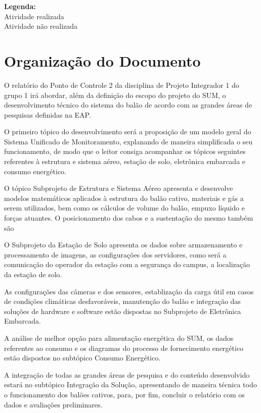 \noindent \textbf{Legenda:} \\
\crule[red]{0.5cm}{0.3cm}	Atividade realizada \\
\crule[blue]{0.5cm}{0.3cm} Atividade não realizada \\

\section{Organização do Documento} %
\label{sec:organiza_o_do_documento}

  O relatório do Ponto de Controle 2 da disciplina de Projeto Integrador 1 do grupo 1 irá abordar, além da definição do escopo do projeto do SUM, o desenvolvimento técnico do sistema do balão de acordo com as grandes áreas de pesquisas definidas na EAP.

  O primeiro tópico do desenvolvimento será a proposição de um modelo geral do Sistema Unificado de Monitoramento, explanando de maneira simplificada o seu funcionamento, de modo que o leitor consiga acompanhar os tópicos seguintes referentes à estrutura e sistema aéreo, estação de solo, eletrônica embarcada e consumo energético.

  O tópico Subprojeto de Estrutura e Sistema Aéreo apresenta e desenvolve modelos matemáticos aplicados à estrutura do balão cativo, materiais e gás a serem utilizados, bem como os cálculos de volume do balão, empuxo líquido e forças atuantes. O posicionamento dos cabos e a sustentação do mesmo também são

  O Subprojeto da Estação de Solo apresenta os dados sobre armazenamento e processamento de imagens, as configurações dos servidores, como será a comunicação  do operador da estação com a segurança do campus, a localização da estação de solo.

  As configurações das câmeras e dos sensores, establização da carga útil em casos de condições climáticas desfavoráveis, manutenção do balão e integração das soluções de hardware e software estão dispostas no Subprojeto de Eletrônica Embarcada.

  A análise de melhor opção para alimentação energética do SUM, os dados referentes ao consumo e os diagramas do processo de fornecimento energético estão dispostos no subtópico Consumo Energético.

  A integração de todas as grandes áreas de pesquisa e do conteúdo desenvolvido estará no subtópico Integração da Solução, apresentando de maneira técnica todo o funcionamento dos balões cativos, para, por fim, concluir o relatório com os dados e avaliações preliminares.
